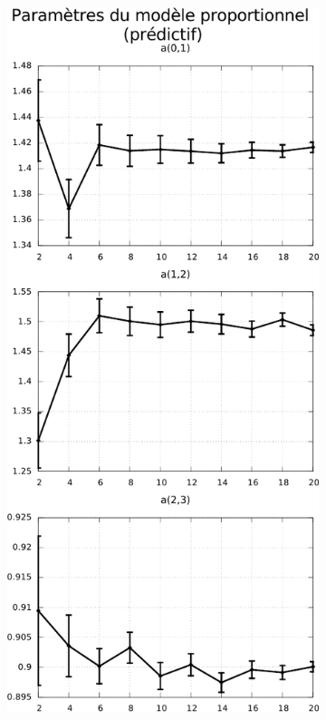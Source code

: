 \begin{figure}[htb]
    \centerfloat
    \begin{subfigure}{0.4\paperwidth}
        \centering
        \includegraphics[type=pdf,ext=.pdf,read=.pdf,width=0.7\linewidth]{../plot/OdometryCMAES/parametersPropOrders}
    \end{subfigure}
    \begin{subfigure}{0.4\paperwidth}
        \centering

\end{subfigure}
\end{figure}

